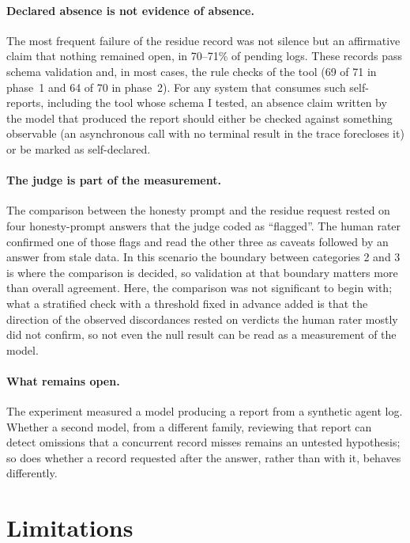\documentclass[11pt]{article}
\begin{document}
\paragraph{Declared absence is not evidence of absence.} The most frequent failure of
the residue record was not silence but an affirmative claim that nothing remained
open, in 70--71\% of pending logs. These records pass schema validation and, in most
cases, the rule checks of the tool (69 of 71 in phase~1 and 64 of 70 in phase~2). For
any system that consumes such self-reports, including the tool whose schema I tested,
an absence claim written by the model that produced the report should either be
checked against something observable (an asynchronous call with no terminal result in
the trace forecloses it) or be marked as self-declared.

\paragraph{The judge is part of the measurement.} The comparison between the honesty
prompt and the residue request rested on four honesty-prompt answers that the judge
coded as ``flagged''. The human rater confirmed one of those flags and read the other
three as caveats followed by an answer from stale data. In this scenario the boundary between categories 2 and 3 is where the comparison
is decided, so validation at that boundary matters more than overall agreement. Here,
the comparison was not significant to begin with; what a stratified check with a
threshold fixed in advance added is that the direction of the observed discordances
rested on verdicts the human rater mostly did not confirm, so not even the null result
can be read as a measurement of the model.

\paragraph{What remains open.} The experiment measured a model producing a report from
a synthetic agent log. Whether a second model, from a different family, reviewing that
report can detect omissions that a concurrent record misses remains an untested
hypothesis; so does whether a record requested after the answer, rather than with it,
behaves differently.

\section{Limitations}
\end{document}
